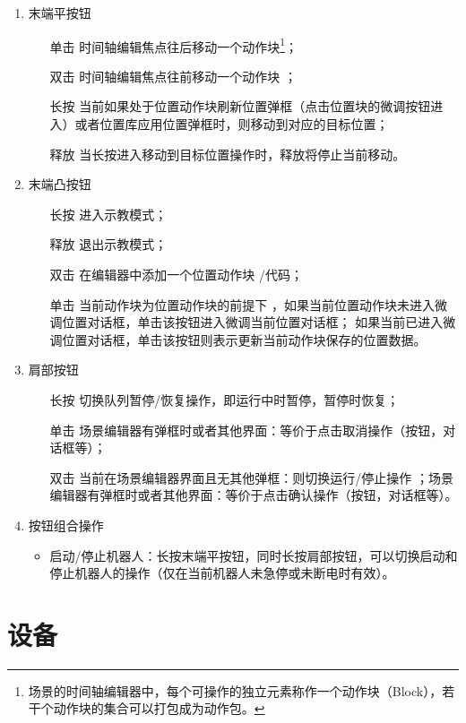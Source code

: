 \begin{enumerate}[label=(\arabic*)]
	\item 末端平按钮
	\begin{itemize}
		\item[单击] 时间轴编辑焦点往后移动一个动作块\footnote{场景的时间轴编辑器中，每个可操作的独立元素称作一个动作块（Block），若干个动作块的集合可以打包成为动作包。}；
		\item[双击] 时间轴编辑焦点往前移动一个动作块 ；
		\item[长按] 当前如果处于位置动作块刷新位置弹框（点击位置块的微调按钮进入）或者位置库应用位置弹框时，则移动到对应的目标位置；
		\item[释放] 当长按进入移动到目标位置操作时，释放将停止当前移动。
	\end{itemize}

	\item 末端凸按钮
	\begin{itemize}
		\item[长按] 进入示教模式；
		\item[释放] 退出示教模式；
		\item[双击] 在编辑器中添加一个位置动作块 /代码；
		\item[单击] 当前动作块为位置动作块的前提下 ，如果当前位置动作块未进入微调位置对话框，单击该按钮进入微调当前位置对话框； 如果当前已进入微调位置对话框，单击该按钮则表示更新当前动作块保存的位置数据。
	\end{itemize}

	\item 肩部按钮
	\begin{itemize}
		\item[长按] 切换队列暂停/恢复操作，即运行中时暂停，暂停时恢复；
		\item[单击] 场景编辑器有弹框时或者其他界面：等价于点击取消操作（按钮，对话框等）；
		\item[双击] 当前在场景编辑器界面且无其他弹框：则切换运行/停止操作 ；场景编辑器有弹框时或者其他界面：等价于点击确认操作（按钮，对话框等）。
	\end{itemize}

	\item 按钮组合操作
	\begin{itemize}
		\item 启动/停止机器人：长按末端平按钮，同时长按肩部按钮，可以切换启动和停止机器人的操作（仅在当前机器人未急停或未断电时有效）。
	\end{itemize}
\end{enumerate}

\section{设备}
